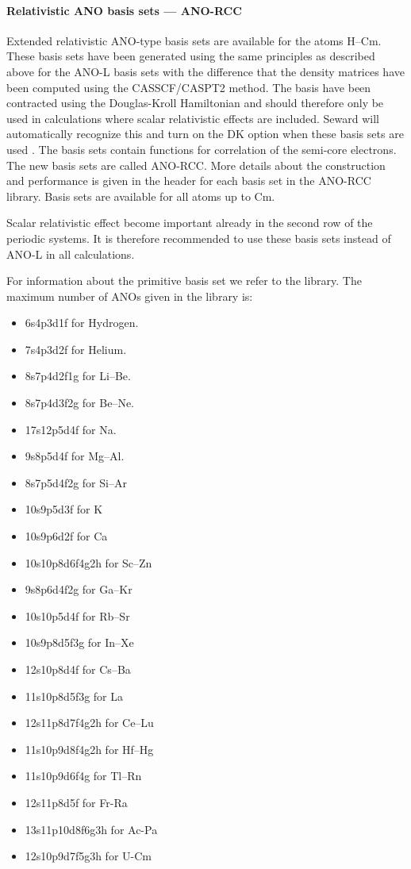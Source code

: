 \paragraph{Relativistic ANO basis sets --- ANO-RCC}
 
Extended relativistic ANO-type basis sets are available for the atoms H--Cm. 
These basis sets have been generated using the same principles as described 
above for the ANO-L basis sets with the difference that the density matrices
have been computed using the CASSCF/CASPT2 method. The basis have been 
contracted using the Douglas-Kroll Hamiltonian and should
therefore only be used in calculations where scalar relativistic effects are
included. Seward will automatically recognize this and turn on the DK option
when these basis sets are used \cite{Roos:03c,Roos:03g,Roos:05a,Roos:05b}. The 
basis sets contain functions for correlation of the semi-core electrons. The 
new basis sets are called ANO-RCC. More details about the construction and 
performance is given in the header for each basis set in the ANO-RCC library. 
Basis sets are available for all atoms up to Cm.

Scalar relativistic effect become important already in the second row of the
periodic systems. It is therefore recommended to use these basis sets instead of
ANO-L in all calculations.

For information about the primitive basis set we refer to the library.
The maximum number of ANOs given in the library is:
\begin{itemize}
\item 6s4p3d1f for Hydrogen.
\item 7s4p3d2f for Helium.
\item 8s7p4d2f1g for Li--Be.
\item 8s7p4d3f2g for Be--Ne.
\item 17s12p5d4f for Na.
\item 9s8p5d4f for Mg--Al.
\item 8s7p5d4f2g for Si--Ar
\item 10s9p5d3f for K
\item 10s9p6d2f for Ca
\item 10s10p8d6f4g2h for Sc--Zn
\item 9s8p6d4f2g for Ga--Kr
\item 10s10p5d4f for Rb--Sr
\item 10s9p8d5f3g for In--Xe
\item 12s10p8d4f for Cs--Ba
\item 11s10p8d5f3g for La
\item 12s11p8d7f4g2h for Ce--Lu
\item 11s10p9d8f4g2h for Hf--Hg
\item 11s10p9d6f4g for Tl--Rn
\item 12s11p8d5f for Fr-Ra
\item 13s11p10d8f6g3h for Ac-Pa
\item 12s10p9d7f5g3h for U-Cm
\end{itemize}

